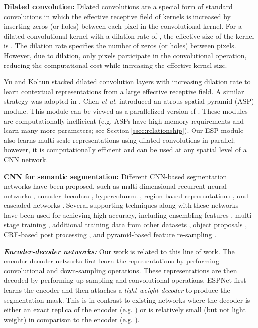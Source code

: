 \documentclass[runningheads]{llncs}
\def\etal{\emph{et al. }}
\begin{document}
\noindent \textbf{Dilated convolution:} Dilated convolutions \cite{holschneider1990real} are a special form of standard convolutions in which the effective receptive field of kernels is increased by inserting zeros (or holes) between each pixel in the convolutional kernel. For a  dilated convolutional kernel with a dilation rate of , the effective size of the kernel is . The dilation rate specifies the number of zeros (or holes) between  pixels. However, due to dilation, only  pixels participate in the convolutional operation, reducing the computational cost while increasing the effective kernel size.

Yu and Koltun \cite{yu2015multi} stacked dilated convolution layers with increasing dilation rate to learn contextual representations from a large effective receptive field. A similar strategy was adopted in \cite{yu2017dilated,mehta2017learning,wang2017understanding}. Chen \etal \cite{chen2016deeplab} introduced an atrous spatial pyramid (ASP) module. This module can be viewed as a parallelized version of \cite{chen2016deeplab}. These modules are computationally inefficient (e.g. ASPs have high memory requirements and learn many more parameters; see Section \ref{ssec:relationship}). Our ESP module also learns multi-scale representations using dilated convolutions in parallel; however, it is computationally efficient and can be used at any spatial level of a CNN network. 

\noindent \textbf{CNN for semantic segmentation:} Different CNN-based segmentation networks have been proposed, such as multi-dimensional recurrent neural networks \cite{mrnn:eke}, encoder-decoders \cite{paszke2016enet,romera2018erfnet,badrinarayanan2017segnet,ronneberger2015u}, hypercolumns \cite{hariharan2015hypercolumns}, region-based representations \cite{dai2015convolutional:eke,Caesar2016:eke}, and cascaded networks \cite{lin2017refinenet}. Several supporting techniques along with these networks have been used for achieving high accuracy, including ensembling features \cite{chen2016deeplab}, multi-stage training \cite{long2015fully}, additional training data from other datasets \cite{zhao2017pyramid,chen2016deeplab}, object proposals \cite{Noh2015:eke}, CRF-based post processing \cite{chen2016deeplab}, and pyramid-based feature re-sampling \cite{zhao2017pyramid,he2014spatial,chen2016deeplab}.

\noindent \textbf{\textit{Encoder-decoder networks:}} Our work is related to this line of work. The encoder-decoder networks first learn the representations by performing convolutional and down-sampling operations. These representations are then decoded by performing up-sampling and convolutional operations. ESPNet first learns the encoder and then attaches a \textit{light-weight decoder} to produce the segmentation mask. This is in contrast to existing networks where the decoder is either an exact replica of the encoder (e.g. \cite{badrinarayanan2017segnet}) or  is relatively small (but not light weight) in comparison to the encoder (e.g. \cite{paszke2016enet,romera2018erfnet}). 
\end{document}
